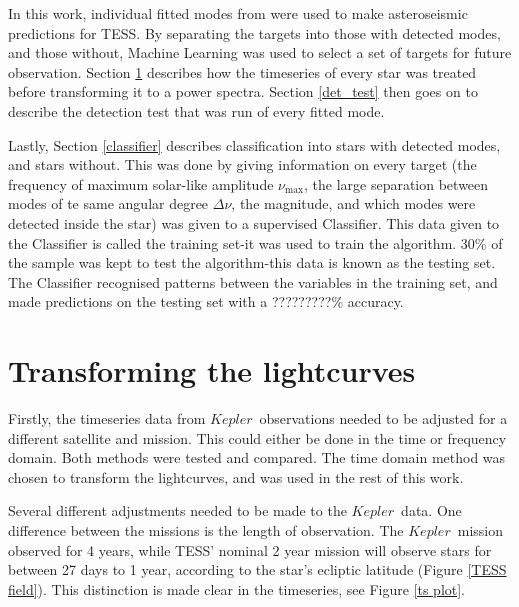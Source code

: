 \documentclass[a4paper,fleqn,usenatbib,useAMS]{mnras}
\newcommand{\numax}{\ensuremath{\nu_{\textrm{max}}}}
\newcommand{\dnu}{\ensuremath{\Delta\nu}}
\newcommand{\kep}{\ensuremath{Kepler}}
\begin{document}
In this work, individual fitted modes from \citet{davies_asteroseismology_2016} were used to make asteroseismic predictions for TESS. By separating the targets into those with detected modes, and those without, Machine Learning was used to select a set of targets for future observation. Section \ref{dataset} describes how the timeseries of every star was treated before transforming it to a power spectra. Section \ref{det_test} then goes on to describe the detection test that was run of every fitted mode.

Lastly, Section \ref{classifier} describes classification into stars with detected modes, and stars without. This was done by giving information on every target (the frequency of maximum solar-like amplitude \numax, the large separation between modes of te same angular degree \dnu, the magnitude, and which modes were detected inside the star) was given to a supervised Classifier. This data given to the Classifier is called the training set-it was used to train the algorithm. 30\% of the sample was kept to test the algorithm-this data is known as the testing set. The Classifier recognised patterns between the variables in the training set, and made predictions on the testing set with a ?????????\% accuracy. 


\section{Transforming the lightcurves}
\label{dataset}

Firstly, the timeseries data from \kep \ observations needed to be adjusted for a different satellite and mission. This could either be done in the time or frequency domain. Both methods were tested and compared. The time domain method was chosen to transform the lightcurves, and was used in the rest of this work.

Several different adjustments needed to be made to the \kep \ data. One difference between the missions is the length of observation. The \kep \ mission observed for 4 years, while TESS' nominal 2 year mission will observe stars for between 27 days to 1 year, according to the star's ecliptic latitude (Figure \ref{TESS field}). This distinction is made clear in the timeseries, see Figure \ref{ts plot}.
\end{document}
